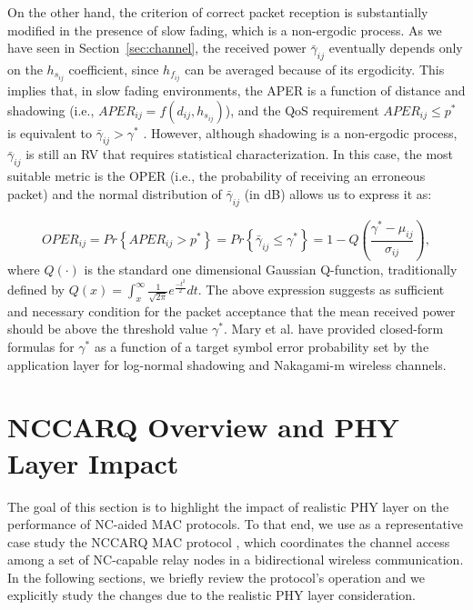 \documentclass[12pt,draftcls, onecolumn]{IEEEtran}
\begin{document}
On the other hand, the criterion of correct packet reception is substantially modified in the presence of slow fading, which is a non-ergodic process. As we have seen in Section~\ref{sec:channel}, the received power $\bar{\gamma}_{ij}$ eventually depends only on the $h_{s_{ij}}$ coefficient, since $h_{f_{ij}}$ can be averaged because of its ergodicity. This implies that, in slow fading environments, the APER is a function of distance and shadowing (i.e., $APER_{ij} = f(d_{ij},h_{s_{ij}})$), and the QoS requirement $APER_{ij}\leq p^*$ is equivalent to $\bar{\gamma}_{ij}>\gamma^*$ \cite{5288484}. However, although shadowing is a non-ergodic process, $\bar{\gamma}_{ij}$ is still an RV that requires statistical characterization. In this case, the most suitable metric is the OPER (i.e., the probability of receiving an erroneous packet) and the normal distribution of $\bar{\gamma}_{ij}$ (in dB) allows us to express it as:

\begin{equation}
OPER_{ij}=Pr\left\{APER_{ij}> p^*\right\}=Pr\left\{\bar{\gamma}_{{ij}}\leq \gamma^*\right\}=1-Q\left(\frac{\gamma^*-\mu_{{ij}}}{\sigma_{{ij}}}\right),
\end{equation}
where $Q\left(\cdot\right)$ is the standard one dimensional Gaussian Q-function, traditionally defined by $Q\left(x\right) = \int^{\infty}_{x}\frac{1}{\sqrt{2\pi}}e^{\frac{-t^2}{2}}dt$. The above expression suggests as sufficient and necessary condition for the packet acceptance that the mean received power should be above the threshold value $\gamma^*$. Mary et al. \cite{5288484} have provided closed-form formulas for $\gamma^*$ as a function of a target symbol error probability set by the application layer for log-normal shadowing and Nakagami-m wireless channels.

\section{NCCARQ Overview and PHY Layer Impact}
\label{sec:impact}

The goal of this section is to highlight the impact of realistic PHY layer on the performance of NC-aided MAC protocols. To that end, we use as a representative case study the NCCARQ MAC protocol \cite{nccarq}, which coordinates the channel access among a set of NC-capable relay nodes in a bidirectional wireless communication. In the following sections, we briefly review the protocol's operation and we explicitly study the changes due to the realistic PHY layer consideration.
\end{document}
